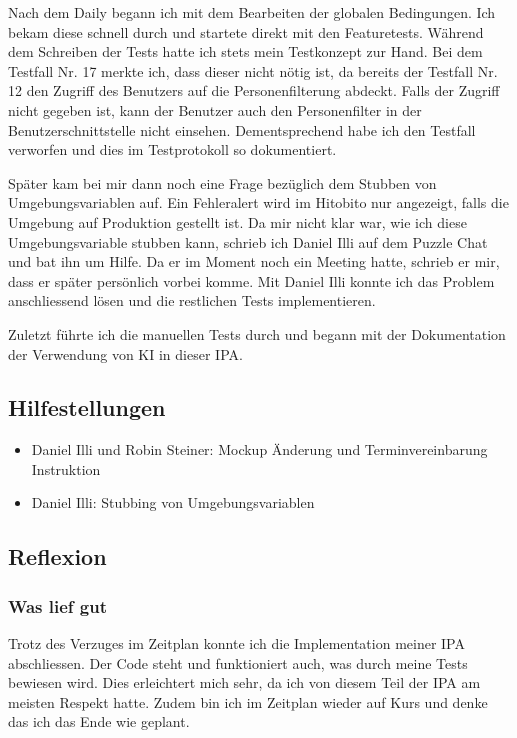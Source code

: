 Nach dem Daily begann ich mit dem Bearbeiten der globalen Bedingungen. Ich bekam diese schnell durch und startete direkt mit den Featuretests.
Während dem Schreiben der Tests hatte ich stets mein Testkonzept zur Hand. Bei dem Testfall Nr. 17 merkte ich, dass dieser nicht nötig ist, da bereits der Testfall Nr. 12
den Zugriff des Benutzers auf die Personenfilterung abdeckt. Falls der Zugriff nicht gegeben ist, kann der Benutzer auch den Personenfilter in der Benutzerschnittstelle nicht einsehen.
Dementsprechend habe ich den Testfall verworfen und dies im Testprotokoll so dokumentiert. 

Später kam bei mir dann noch eine Frage bezüglich dem Stubben von Umgebungsvariablen auf. Ein Fehleralert wird im Hitobito nur angezeigt,
falls die Umgebung auf Produktion gestellt ist. Da mir nicht klar war, wie ich diese Umgebungsvariable stubben kann, schrieb ich Daniel Illi auf dem Puzzle Chat und bat ihn um 
Hilfe. Da er im Moment noch ein Meeting hatte, schrieb er mir, dass er später persönlich vorbei komme. Mit Daniel Illi konnte ich das Problem anschliessend lösen und 
die restlichen Tests implementieren.

Zuletzt führte ich die manuellen Tests durch und begann mit der Dokumentation der Verwendung von KI in dieser IPA.

\subsection*{Hilfestellungen}
\begin{itemize}
    \item Daniel Illi und Robin Steiner: Mockup Änderung und Terminvereinbarung Instruktion
    \item Daniel Illi: Stubbing von Umgebungsvariablen
\end{itemize}

\subsection*{Reflexion}

\subsubsection*{Was lief gut}
Trotz des Verzuges im Zeitplan konnte ich die Implementation meiner IPA abschliessen. Der Code steht und funktioniert auch, was durch meine
Tests bewiesen wird. Dies erleichtert mich sehr, da ich von diesem Teil der IPA am meisten Respekt hatte. Zudem bin ich im Zeitplan wieder auf Kurs
und denke das ich das Ende wie geplant. 

